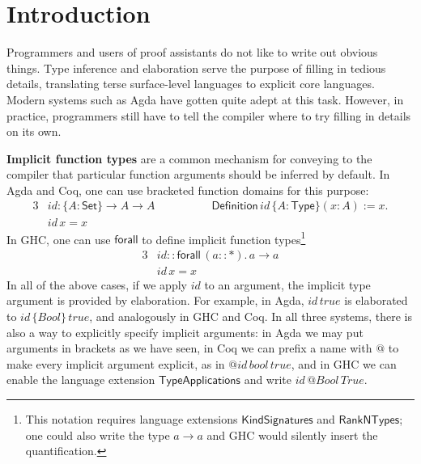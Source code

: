 \documentclass[acmsmall,review,anonymous,prologue,dvipsnames]{acmart}\settopmatter{printfolios=true,printccs=false,printacmref=false}
\newcommand{\kw}[1]{{\mathsf{#1}}}
\theoremstyle{remark}
\begin{document}

\maketitle




\section{Introduction}
\label{sec:introduction}

Programmers and users of proof assistants do not like to write out obvious
things. Type inference and elaboration serve the purpose of filling in tedious
details, translating terse surface-level languages to explicit core
languages. Modern systems such as Agda have gotten quite adept at this
task. However, in practice, programmers still have to tell the compiler where to
try filling in details on its own.

\textbf{Implicit function types} are a common mechanism for conveying to the
compiler that particular function arguments should be inferred by default. In
Agda and Coq, one can use bracketed function domains for this purpose:
\begin{alignat*}{3}
  & id : \{A : \kw{Set}\}\to A \to A \hspace{5em} \kw{Definition}\,id\,\{A : \kw{Type}\}(x : A) := x.\\
  & id\,x = x
\end{alignat*}
In GHC, one can use $\kw{forall}$ to define implicit function
types\footnote{This notation requires language extensions
  $\mathsf{KindSignatures}$ and $\mathsf{RankNTypes}$; one could also write the type
  $a \to a$ and GHC would silently insert the quantification.}
\begin{alignat*}{3}
  & id :: \kw{forall}\,(a :: \kw{*}).\,a \to a\\
  & id\,x = x
\end{alignat*}
In all of the above cases, if we apply $id$ to an argument, the implicit type
argument is provided by elaboration. For example, in Agda, $id\,true$ is
elaborated to $id\,\{Bool\}\,true$, and analogously in GHC and Coq. In all three
systems, there is also a way to explicitly specify implicit arguments: in Agda
we may put arguments in brackets as we have seen, in Coq we can prefix a name
with $\kw{@}$ to make every implicit argument explicit, as in
$\kw{@}id\,bool\,true$, and in GHC we can enable the language extension
$\mathsf{TypeApplications}$ \cite{eisenberg2016visible} and write
$id\,\kw{@}Bool\,True$.
\end{document}
